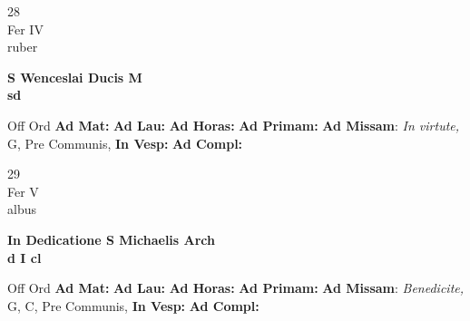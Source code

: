 \documentclass[10pt, openany]{book}
\begin{document}
    \begin{center}
        \begin{minipage}{3.5in}
            \vspace{2em}
            \begin{minipage}{0.5in}
                {\Huge 28} \\
                {\normalsize Fer IV} \\
                {\normalsize ruber}
            \end{minipage}
            \begin{minipage}{3.0in}
                \textbf{ \large S Wenceslai Ducis M \\
                \textnormal{\normalsize sd}} \\ 
            \end{minipage}
            \begin{justify}Off Ord
                \textbf{Ad Mat: }
                \textbf{Ad Lau: }
                \textbf{Ad Horas: }
                \textbf{Ad Primam: }\textbf{Ad Missam}: \textit{In virtute,} G, Pre Communis,  
                \textbf{In Vesp: }
                \textbf{Ad Compl: }
            \end{justify}
        \end{minipage}
    \end{center}

    \begin{center}
        \begin{minipage}{3.5in}
            \vspace{2em}
            \begin{minipage}{0.5in}
                {\Huge 29} \\
                {\normalsize Fer V} \\
                {\normalsize albus}
            \end{minipage}
            \begin{minipage}{3.0in}
                \textbf{ \large In Dedicatione S Michaelis Arch \\
                \textnormal{\normalsize d I cl}} \\ 
            \end{minipage}
            \begin{justify}Off Ord
                \textbf{Ad Mat: }
                \textbf{Ad Lau: }
                \textbf{Ad Horas: }
                \textbf{Ad Primam: }\textbf{Ad Missam}: \textit{Benedicite,} G, C, Pre Communis,  
                \textbf{In Vesp: }
                \textbf{Ad Compl: }
            \end{justify}
        \end{minipage}
    \end{center}
\end{document}
